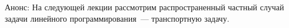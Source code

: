 \documentclass[unicode,11pt,notheorems]{beamer}
\begin{document}
\begin{frame}{Анонс:}
	На следующей лекции рассмотрим распространенный частный случай задачи линейного программирования~--- транспортную задачу.
\end{frame}



%
%
%
% 
\end{document}
